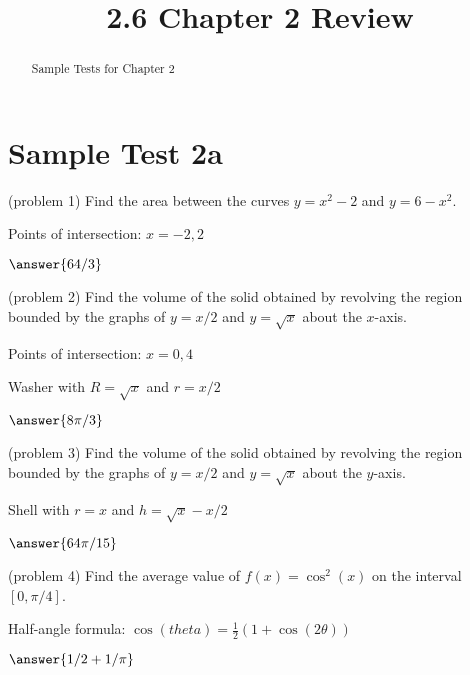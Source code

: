 \documentclass[handout]{ximera}
\title{2.6 Chapter 2 Review}
\begin{document}
\begin{abstract}
Sample Tests for Chapter 2
\end{abstract}

\maketitle

\section{Sample Test 2a}

\begin{problem}(problem 1)
Find the area between the curves $y = x^2 - 2$ and $y = 6 -x^2$.\\
\begin{hint}
Points of intersection: $x = -2, 2$
\end{hint}
$\answer{64/3}$
\end{problem}


\begin{problem}(problem 2)
Find the volume of the solid obtained by revolving the region bounded by the 
graphs of $y = x/2$ and $y = \sqrt x$ about the $x$-axis.\\
\begin{hint}
Points of intersection: $x = 0, 4$
\end{hint}\begin{hint}
Washer with $R = \sqrt x$ and $r = x/2$
\end{hint}
$\answer{8\pi/3}$
\end{problem}


\begin{problem}(problem 3)
Find the volume of the solid obtained by revolving the region bounded by the 
graphs of $y = x/2$ and $y = \sqrt x$ about the $y$-axis.\\
\begin{hint}
Shell with $r = x$ and $h = \sqrt x - x/2$
\end{hint}
$\answer{64\pi/15}$
\end{problem}


\begin{problem}(problem 4)
Find the average value of $f(x) = \cos^2(x)$ on the interval $[0, \pi/4]$.\\
\begin{hint}
Half-angle formula: $\cos(theta) = \frac12 (1+\cos(2\theta))$
\end{hint}
$\answer{1/2 + 1/\pi}$
\end{problem}
\end{document}

